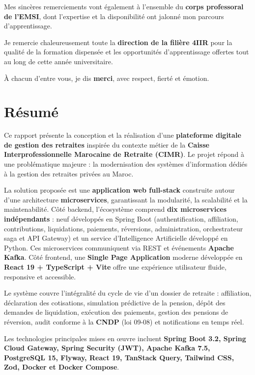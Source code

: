 \documentclass[12pt,a4paper,oneside]{report}
\begin{document}
Mes sincères remerciements vont également à l'ensemble du \textbf{corps professoral de l'EMSI}, dont l'expertise et la disponibilité ont jalonné mon parcours d'apprentissage.

Je remercie chaleureusement toute la \textbf{direction de la filière 4IIR} pour la qualité de la formation dispensée et les opportunités d'apprentissage offertes tout au long de cette année universitaire.

À chacun d'entre vous, je dis \textbf{merci}, avec respect, fierté et émotion.

\chapter*{Résumé}

Ce rapport présente la conception et la réalisation d'une \textbf{plateforme digitale de gestion des retraites} inspirée du contexte métier de la \textbf{Caisse Interprofessionnelle Marocaine de Retraite (CIMR)}. Le projet répond à une problématique majeure : la modernisation des systèmes d'information dédiés à la gestion des retraites privées au Maroc.

La solution proposée est une \textbf{application web full-stack} construite autour d'une architecture \textbf{microservices}, garantissant la modularité, la scalabilité et la maintenabilité. Côté backend, l'écosystème comprend \textbf{dix microservices indépendants} : neuf développés en Spring Boot (authentification, affiliation, contributions, liquidations, paiements, réversions, administration, orchestrateur saga et API Gateway) et un service d'Intelligence Artificielle développé en Python. Ces microservices communiquent via REST et événements \textbf{Apache Kafka}. Côté frontend, une \textbf{Single Page Application} moderne développée en \textbf{React 19 + TypeScript + Vite} offre une expérience utilisateur fluide, responsive et accessible.

Le système couvre l'intégralité du cycle de vie d'un dossier de retraite : affiliation, déclaration des cotisations, simulation prédictive de la pension, dépôt des demandes de liquidation, exécution des paiements, gestion des pensions de réversion, audit conforme à la \textbf{CNDP} (loi 09-08) et notifications en temps réel.

Les technologies principales mises en œuvre incluent \textbf{Spring Boot 3.2, Spring Cloud Gateway, Spring Security (JWT), Apache Kafka 7.5, PostgreSQL 15, Flyway, React 19, TanStack Query, Tailwind CSS, Zod, Docker et Docker Compose}.
\end{document}
